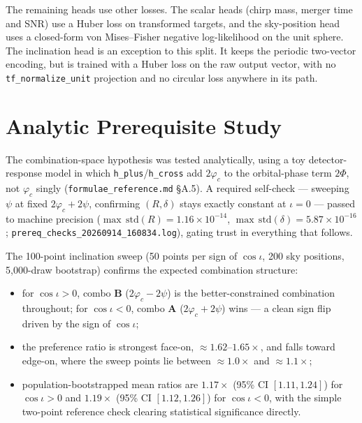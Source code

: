 The remaining heads use other losses.
The scalar heads (chirp mass, merger time and SNR) use a Huber loss on transformed targets, and the sky-position head uses a closed-form von Mises--Fisher negative log-likelihood on the unit sphere.
The inclination head is an exception to this split.
It keeps the periodic two-vector encoding, but is trained with a Huber loss on the raw output vector, with no \texttt{tf\_normalize\_unit} projection and no circular loss anywhere in its path.


\section{Analytic Prerequisite Study}
\label{sec:phicpsi:prereq}

The combination-space hypothesis was tested analytically, using a toy detector-response model in which \texttt{h\_plus}/\texttt{h\_cross} add $2\varphi_c$ to the orbital-phase term $2\Phi$, not $\varphi_c$ singly (\texttt{formulae\_reference.md} \S A.5).
A required self-check --- sweeping $\psi$ at fixed $2\varphi_c + 2\psi$, confirming $(R,\delta)$ stays exactly constant at $\iota=0$ --- passed to machine precision ($\max\,\text{std}(R) = 1.16\times10^{-14}$, $\max\,\text{std}(\delta) = 5.87\times10^{-16}$; \texttt{prereq\_checks\_20260914\_160834.log}), gating trust in everything that follows.

The 100-point inclination sweep (50 points per sign of $\cos\iota$, 200 sky positions, 5{,}000-draw bootstrap) confirms the expected combination structure:
\begin{itemize}
\item for $\cos\iota > 0$, combo \textbf{B} ($2\varphi_c - 2\psi$) is the better-constrained combination throughout; for $\cos\iota < 0$, combo \textbf{A} ($2\varphi_c + 2\psi$) wins --- a clean sign flip driven by the sign of $\cos\iota$;
\item the preference ratio is strongest face-on, $\approx 1.62$--$1.65\times$, and falls toward edge-on, where the sweep points lie between $\approx 1.0\times$ and $\approx 1.1\times$;
\item population-bootstrapped mean ratios are $1.17\times$ (95\% CI $[1.11, 1.24]$) for $\cos\iota > 0$ and $1.19\times$ (95\% CI $[1.12, 1.26]$) for $\cos\iota < 0$, with the simple two-point reference check clearing statistical significance directly.
\end{itemize}

